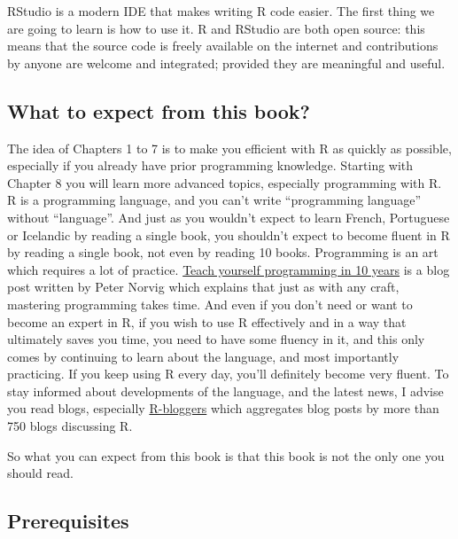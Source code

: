 \documentclass[]{gitbook}
\begin{document}
RStudio is a modern IDE that makes writing R code easier. The first thing we are going to learn is
how to use it.
R and RStudio are both open source: this means that the source code is freely available on
the internet and contributions by anyone are welcome and integrated; provided they are meaningful
and useful.

\hypertarget{what-to-expect-from-this-book}{%
\subsection*{What to expect from this book?}\label{what-to-expect-from-this-book}}

The idea of Chapters 1 to 7 is to make you efficient with R as quickly as possible, especially if
you already have prior programming knowledge. Starting with Chapter 8 you will learn more advanced
topics, especially programming with R. R is a programming language, and you can't write
``programming language'' without ``language''. And just as you wouldn't expect to learn
French, Portuguese or Icelandic by reading a single book, you shouldn't expect to become fluent in R
by reading a single book, not even by reading 10 books. Programming is an art which requires a lot of
practice. \href{http://www.norvig.com/21-days.html}{Teach yourself programming in 10 years} is a blog
post written by Peter Norvig which explains that just as with any craft, mastering programming
takes time. And even if you don't need or want to become an expert in R, if you wish to use R
effectively and in a way that ultimately saves you time, you need to have some fluency in it, and
this only comes by continuing to learn about the language, and most importantly practicing. If you
keep using R every day, you'll definitely become very fluent. To stay informed about developments of
the language, and the latest news, I advise you read blogs, especially
\href{https://www.r-bloggers.com/}{R-bloggers} which aggregates blog posts by more than 750 blogs
discussing R.

So what you can expect from this book is that this book is not the only one you should read.

\hypertarget{prerequisites}{%
\subsection*{Prerequisites}\label{prerequisites}}
\end{document}

